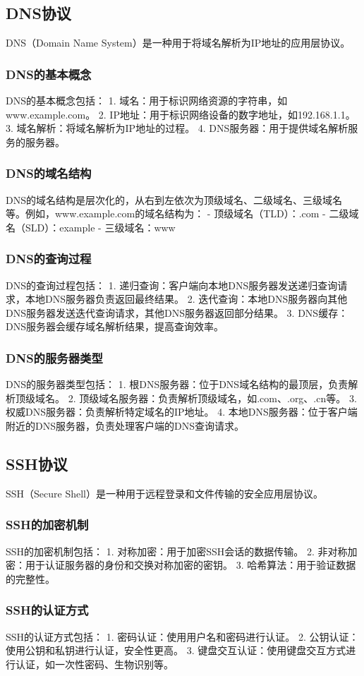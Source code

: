 \documentclass{book}
\begin{document}
\subsection{DNS协议}
DNS（Domain Name System）是一种用于将域名解析为IP地址的应用层协议。
\subsubsection{DNS的基本概念}
DNS的基本概念包括：
1. 域名：用于标识网络资源的字符串，如www.example.com。
2. IP地址：用于标识网络设备的数字地址，如192.168.1.1。
3. 域名解析：将域名解析为IP地址的过程。
4. DNS服务器：用于提供域名解析服务的服务器。
\subsubsection{DNS的域名结构}
DNS的域名结构是层次化的，从右到左依次为顶级域名、二级域名、三级域名等。例如，www.example.com的域名结构为：
- 顶级域名（TLD）：.com
- 二级域名（SLD）：example
- 三级域名：www
\subsubsection{DNS的查询过程}
DNS的查询过程包括：
1. 递归查询：客户端向本地DNS服务器发送递归查询请求，本地DNS服务器负责返回最终结果。
2. 迭代查询：本地DNS服务器向其他DNS服务器发送迭代查询请求，其他DNS服务器返回部分结果。
3. DNS缓存：DNS服务器会缓存域名解析结果，提高查询效率。
\subsubsection{DNS的服务器类型}
DNS的服务器类型包括：
1. 根DNS服务器：位于DNS域名结构的最顶层，负责解析顶级域名。
2. 顶级域名服务器：负责解析顶级域名，如.com、.org、.cn等。
3. 权威DNS服务器：负责解析特定域名的IP地址。
4. 本地DNS服务器：位于客户端附近的DNS服务器，负责处理客户端的DNS查询请求。
\subsection{SSH协议}
SSH（Secure Shell）是一种用于远程登录和文件传输的安全应用层协议。
\subsubsection{SSH的加密机制}
SSH的加密机制包括：
1. 对称加密：用于加密SSH会话的数据传输。
2. 非对称加密：用于认证服务器的身份和交换对称加密的密钥。
3. 哈希算法：用于验证数据的完整性。
\subsubsection{SSH的认证方式}
SSH的认证方式包括：
1. 密码认证：使用用户名和密码进行认证。
2. 公钥认证：使用公钥和私钥进行认证，安全性更高。
3. 键盘交互认证：使用键盘交互方式进行认证，如一次性密码、生物识别等。
\end{document}
